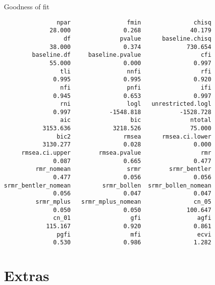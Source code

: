 \documentclass[10pt,ignorenonframetext,]{beamer}
\begin{document}
\begin{frame}[fragile]{Goodness of fit}

\tiny

\begin{verbatim}
               npar                fmin               chisq 
             28.000               0.268              40.179 
                 df              pvalue      baseline.chisq 
             38.000               0.374             730.654 
        baseline.df     baseline.pvalue                 cfi 
             55.000               0.000               0.997 
                tli                nnfi                 rfi 
              0.995               0.995               0.920 
                nfi                pnfi                 ifi 
              0.945               0.653               0.997 
                rni                logl   unrestricted.logl 
              0.997           -1548.818           -1528.728 
                aic                 bic              ntotal 
           3153.636            3218.526              75.000 
               bic2               rmsea      rmsea.ci.lower 
           3130.277               0.028               0.000 
     rmsea.ci.upper        rmsea.pvalue                 rmr 
              0.087               0.665               0.477 
         rmr_nomean                srmr        srmr_bentler 
              0.477               0.056               0.056 
srmr_bentler_nomean         srmr_bollen  srmr_bollen_nomean 
              0.056               0.047               0.047 
         srmr_mplus   srmr_mplus_nomean               cn_05 
              0.050               0.050             100.647 
              cn_01                 gfi                agfi 
            115.167               0.920               0.861 
               pgfi                 mfi                ecvi 
              0.530               0.986               1.282 
\end{verbatim}

\end{frame}

\section{Extras}\label{extras}
\end{document}
